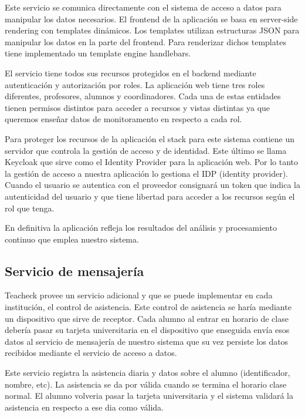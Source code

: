 Este servicio se comunica directamente con el sistema de acceso a
datos para manipular los datos necesarios. El frontend de la
aplicación se basa en server-side rendering con templates
dinámicos. Los templates utilizan estructuras JSON para manipular los
datos en la parte del frontend. Para renderizar dichos templates tiene
implementado un template engine handlebars.

El servicio tiene todos sus recursos protegidos en el backend mediante
autenticación y autorización por roles. La aplicación web tiene tres
roles diferentes, profesores, alumnos y coordinadores. Cada una de
estas entidades tienen permisos distintos para acceder a recursos y
vistas distintas ya que queremos enseñar datos de monitoramento en
respecto a cada rol.

Para proteger los recursos de la aplicación el stack para este sistema
contiene un servidor que controla la gestión de acceso y de
identidad. Este último se llama Keycloak que sirve como el Identity
Provider para la aplicación web. Por lo tanto la gestión de acceso a
nuestra aplicación lo gestiona el IDP (identity provider). Cuando el
usuario se autentica con el proveedor consignará un token que indica
la autenticidad del usuario y que tiene libertad para acceder a los
recursos según el rol que tenga.

En definitiva la aplicación refleja los resultados del análisis y
procesamiento continuo que emplea nuestro sistema.

\subsection{Servicio de mensajería}
\label{servicioMensajería}

Teacheck provee un servicio adicional y que se puede implementar en
cada institución, el control de asistencia. Este control de asistencia
se haría mediante un dispositivo que sirve de receptor. Cada alumno al
entrar en horario de clase debería pasar su tarjeta universitaria en
el dispositivo que enseguida envía esos datos al servicio de
mensajería de nuestro sistema que su vez persiste los datos recibidos
mediante el servicio de acceso a datos.

Este servicio registra la asistencia diaria y datos sobre el alumno
(identificador, nombre, etc).  La asistencia se da por válida cuando
se termina el horario clase normal. El alumno volveria pasar la
tarjeta universitaria y el sistema validará la asistencia en respecto
a ese dia como válida.

